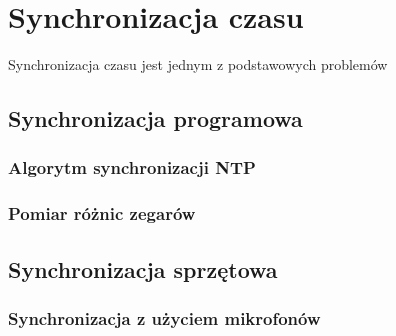 \chapter{Synchronizacja czasu}

Synchronizacja czasu jest jednym z podstawowych problemów 

\section{Synchronizacja programowa}

\subsection{Algorytm synchronizacji NTP}

\subsection{Pomiar różnic zegarów}

\section{Synchronizacja sprzętowa}

\subsection{Synchronizacja z użyciem mikrofonów}
